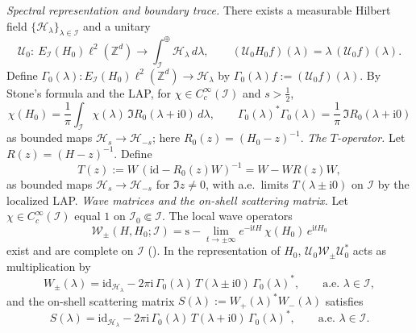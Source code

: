 \documentclass[10pt]{amsart} %
\newcommand{\1}{{\mathbb{I}}}
\newcommand{\Hr}{\mathscr{H}}
\numberwithin{equation}{section}
\begin{document}
\emph{Spectral representation and boundary trace.}
There exists a measurable Hilbert field $\{\Hr_\lambda\}_{\lambda\in \mathcal{I}}$
and a unitary
\[
\mathcal{U}_0:\ E_{\mathcal{I}}(H_0)\ell^2(\mathbb{Z}^d)\longrightarrow \int_{\mathcal{I}}^\oplus \Hr_\lambda\,d\lambda,
\qquad (\mathcal{U}_0 H_0 f)(\lambda)=\lambda\,(\mathcal{U}_0 f)(\lambda).
\]
Define $\Gamma_0(\lambda):E_{\mathcal{I}}(H_0)\ell^2(\mathbb{Z}^d)\to\Hr_\lambda$ by
$\Gamma_0(\lambda)f:=(\mathcal{U}_0 f)(\lambda)$. By Stone's formula and the LAP, for $\chi\in C_c^\infty(\mathcal{I})$ and $s>\frac{1}{2}$,
\begin{equation}\label{eq:stone-app}
\chi(H_0)=\frac{1}{\pi}\int_{\mathcal{I}}\chi(\lambda)\,\Im R_0(\lambda+\mathrm{i}0)\,d\lambda,
\qquad
\Gamma_0(\lambda)^*\Gamma_0(\lambda)=\frac{1}{\pi}\,\Im R_0(\lambda+\mathrm{i}0)
\end{equation}
as bounded maps $\mathcal{H}_s\to\mathcal{H}_{-s}$; here $R_0(z)=(H_0-z)^{-1}$.
\emph{The $T$-operator.}
Let $R(z)=(H-z)^{-1}$. Define
\begin{equation}\label{eq:T-defs-app}
T(z):=W\,(\mathrm{id}- R_0(z)W)^{-1}=W- W R(z) W,
\end{equation}
as bounded maps $\mathcal{H}_s\to\mathcal{H}_{-s}$ for $\Im z\neq0$, with a.e.\ limits $T(\lambda\pm\mathrm{i}0)$ on $\mathcal{I}$ by the localized LAP.
\emph{Wave matrices and the on-shell scattering matrix.}
Let $\chi\in C_c^\infty(\mathcal{I})$ equal $1$ on $\mathcal{I}_0\Subset \mathcal{I}$. The local wave operators
\[
\mathcal{W}_\pm(H,H_0;\mathcal{I})=\mathrm{s}\!-\!\lim_{t\to\pm\infty}e^{-\mathrm{i} tH}\,\chi(H_0)\,e^{\mathrm{i} tH_0}
\]
exist and are complete on $\mathcal{I}$ (\cite[Thm.~7.7.1]{ABG}). In the representation of $H_0$,
$\mathcal{U}_0 \mathcal{W}_\pm \mathcal{U}_0^*$ acts as multiplication by
\begin{equation}\label{eq:Wpm}
W_\pm(\lambda)=\mathrm{id}_{\Hr_\lambda}-2\pi\mathrm{i}\,\Gamma_0(\lambda)\,T(\lambda\pm\mathrm{i}0)\,\Gamma_0(\lambda)^*,
\qquad \text{a.e. }\lambda\in \mathcal{I},
\end{equation}
and the on-shell scattering matrix $S(\lambda):=W_+(\lambda)^*W_-(\lambda)$ satisfies
\begin{equation}\label{eq:S-stationary}
S(\lambda)=\mathrm{id}_{\Hr_\lambda}-2\pi\mathrm{i}\,\Gamma_0(\lambda)\,T(\lambda+\mathrm{i}0)\,\Gamma_0(\lambda)^*,
\qquad \text{a.e. }\lambda\in \mathcal{I}.
\end{equation}
\end{document}
